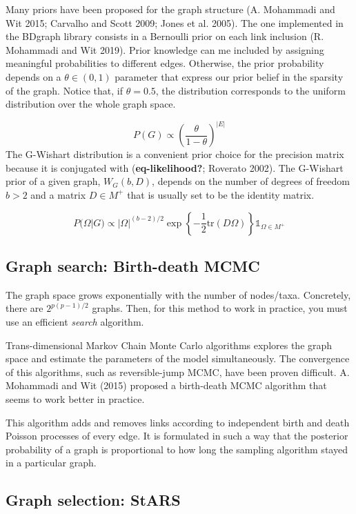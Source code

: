 \documentclass[
]{article}
\begin{document}
Many priors have been proposed for the graph structure (A. Mohammadi and
Wit 2015; Carvalho and Scott 2009; Jones et al. 2005). The one
implemented in the BDgraph library consists in a Bernoulli prior on each
link inclusion (R. Mohammadi and Wit 2019). Prior knowledge can me
included by assigning meaningful probabilities to different edges.
Otherwise, the prior probability depends on a \(\theta \in (0, 1)\)
parameter that express our prior belief in the sparsity of the graph.
Notice that, if \(\theta = 0.5\), the distribution corresponds to the
uniform distribution over the whole graph space.

\[
P(G) \propto \left ( \frac{\theta}{1-\theta}\right) ^{|E|}
\]The G-Wishart distribution is a convenient prior choice for the
precision matrix because it is conjugated with (\textbf{eq-likelihood?};
Roverato 2002). The G-Wishart prior of a given graph, \(W_G(b, D)\),
depends on the number of degrees of freedom \(b>2\) and a matrix
\(D\in M^+\) that is usually set to be the identity matrix.

\[
P(\Omega|G) \propto |\Omega|^{(b-2)/2} \exp\left \{ -\frac 1 2 \text{tr}(D\Omega)  \right\} \mathbb 1_{\Omega\in M ^+}
\]

\hypertarget{graph-search-birth-death-mcmc}{%
\subsection{Graph search: Birth-death
MCMC}\label{graph-search-birth-death-mcmc}}

The graph space grows exponentially with the number of nodes/taxa.
Concretely, there are \(2^{p(p-1)/2}\) graphs. Then, for this method to
work in practice, you must use an efficient \emph{search} algorithm.

Trans-dimensional Markov Chain Monte Carlo algorithms explores the graph
space and estimate the parameters of the model simultaneously. The
convergence of this algorithms, such as reversible-jump MCMC, have been
proven difficult. A. Mohammadi and Wit (2015) proposed a birth-death
MCMC algorithm that seems to work better in practice.

This algorithm adds and removes links according to independent birth and
death Poisson processes of every edge. It is formulated in such a way
that the posterior probability of a graph is proportional to how long
the sampling algorithm stayed in a particular graph.

\hypertarget{graph-selection-stars}{%
\subsection{Graph selection: StARS}\label{graph-selection-stars}}
\end{document}
